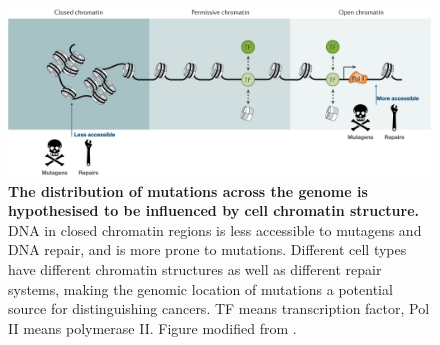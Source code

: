 \begin{figure}[htbp!]
    \centering
    \includegraphics[scale=0.24]{graphics/chromatin_demo.png}
    \caption{\textbf{The distribution of mutations across the genome is hypothesised to be influenced by cell chromatin structure.} DNA in closed chromatin regions is less accessible to mutagens and DNA repair, and is more prone to mutations. Different cell types have different chromatin structures as well as different repair systems, making the genomic location of mutations a potential source for distinguishing cancers.  TF means transcription factor, Pol II means polymerase II. Figure modified from \citet{Klemm2019ChromatinEpigenome}.}
    \label{fig:chromatin_demo}
\end{figure}
